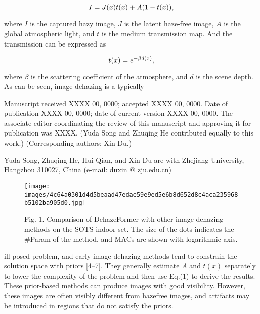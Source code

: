 \documentclass{article}
\begin{document}
\[
$$$$I=J(x)t(x)+A(1-t(x)),
\]


where $I$ is the captured hazy image, $J$ is the latent haze-free image, $A$ is the global atmospheric light, and $t$ is the medium transmission map. And the transmission can be expressed as


\[
$$$$t(x)=e^{-\beta d(x)},
\]


where $\beta$ is the scattering coefficient of the atmosphere, and $d$ is the scene depth. As can be seen, image dehazing is a typically


Manuscript received XXXX 00, 0000; accepted XXXX 00, 0000. Date of publication XXXX 00, 0000; date of current version XXXX 00, 0000. The associate editor coordinating the review of this manuscript and approving it for publication was XXXX. (Yuda Song and Zhuqing He contributed equally to this work.) (Corresponding authors: Xin Du.)


Yuda Song, Zhuqing He, Hui Qian, and Xin Du are with Zhejiang University, Hangzhou 310027, China (e-mail: duxin $@$ zju.edu.cn)


\begin{figure}[htbp]
\centering
\texttt{[image: images/4c64a0301d4d5beaad47edae59e9ed5e6b8d652d8c4aca235968b5102ba905d0.jpg]}
\caption{Fig. 1. Comparison of DehazeFormer with other image dehazing methods on the SOTS indoor set. The size of the dots indicates the #Param of the method, and MACs are shown with logarithmic axis.}
\end{figure}


ill-posed problem, and early image dehazing methods tend to constrain the solution space with priors [4–7]. They generally estimate $A$ and $t(x)$ separately to lower the complexity of the problem and then use Eq.(1) to derive the results. These prior-based methods can produce images with good visibility. However, these images are often visibly different from hazefree images, and artifacts may be introduced in regions that do not satisfy the priors.
\end{document}
